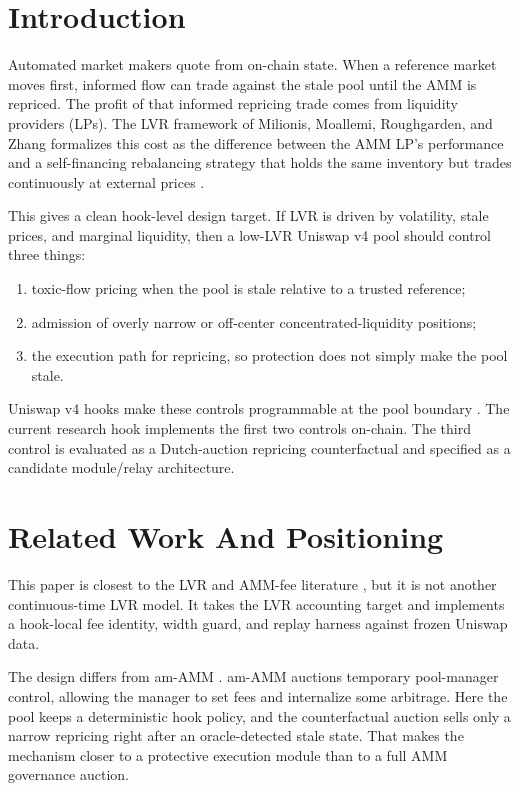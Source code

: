 \documentclass[11pt]{article}
\begin{document}
\section{Introduction}

Automated market makers quote from on-chain state. When a reference market moves first, informed flow can trade against the stale pool until the AMM is repriced. The profit of that informed repricing trade comes from liquidity providers (LPs). The LVR framework of Milionis, Moallemi, Roughgarden, and Zhang formalizes this cost as the difference between the AMM LP's performance and a self-financing rebalancing strategy that holds the same inventory but trades continuously at external prices \cite{milionis-lvr}.

This gives a clean hook-level design target. If LVR is driven by volatility, stale prices, and marginal liquidity, then a low-LVR Uniswap v4 pool should control three things:

\begin{enumerate}
  \item toxic-flow pricing when the pool is stale relative to a trusted reference;
  \item admission of overly narrow or off-center concentrated-liquidity positions;
  \item the execution path for repricing, so protection does not simply make the pool stale.
\end{enumerate}

Uniswap v4 hooks make these controls programmable at the pool boundary \cite{uniswap-v4}. The current research hook implements the first two controls on-chain. The third control is evaluated as a Dutch-auction repricing counterfactual and specified as a candidate module/relay architecture.

\section{Related Work And Positioning}

This paper is closest to the LVR and AMM-fee literature \cite{milionis-lvr,milionis-fees}, but it is not another continuous-time LVR model. It takes the LVR accounting target and implements a hook-local fee identity, width guard, and replay harness against frozen Uniswap data.

The design differs from am-AMM \cite{amamm}. am-AMM auctions temporary pool-manager control, allowing the manager to set fees and internalize some arbitrage. Here the pool keeps a deterministic hook policy, and the counterfactual auction sells only a narrow repricing right after an oracle-detected stale state. That makes the mechanism closer to a protective execution module than to a full AMM governance auction.
\end{document}

